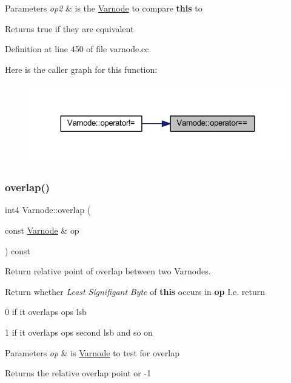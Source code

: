 \begin{DoxyParams}{Parameters}
{\em op2} & is the \mbox{\hyperlink{class_varnode}{Varnode}} to compare {\bfseries{this}} to \\
\hline
\end{DoxyParams}
\begin{DoxyReturn}{Returns}
true if they are equivalent 
\end{DoxyReturn}


Definition at line 450 of file varnode.\+cc.

Here is the caller graph for this function\+:
\nopagebreak
\begin{figure}[H]
\begin{center}
\leavevmode
\includegraphics[width=324pt]{class_varnode_afab4c9a244385f9c849ead46102b69d8_icgraph}
\end{center}
\end{figure}
\mbox{\label{class_varnode_a3317ab5e04ef326f4c68ece1929539a6}} 
\subsubsection{\texorpdfstring{overlap()}{overlap()}\hspace{0.1cm}{\footnotesize\ttfamily [1/2]}}
{\footnotesize\ttfamily int4 Varnode\+::overlap (\begin{DoxyParamCaption}\item[{const \mbox{\hyperlink{class_varnode}{Varnode}} \&}]{op }\end{DoxyParamCaption}) const}



Return relative point of overlap between two Varnodes. 

Return whether {\itshape Least} {\itshape Signifigant} {\itshape Byte} of {\bfseries{this}} occurs in {\bfseries{op}} I.\+e. return
\begin{DoxyItemize}
\item 0 if it overlaps op\textquotesingle{}s lsb
\item 1 if it overlaps op\textquotesingle{}s second lsb and so on 
\begin{DoxyParams}{Parameters}
{\em op} & is \mbox{\hyperlink{class_varnode}{Varnode}} to test for overlap \\
\hline
\end{DoxyParams}
\begin{DoxyReturn}{Returns}
the relative overlap point or -\/1 
\end{DoxyReturn}

\end{DoxyItemize}

